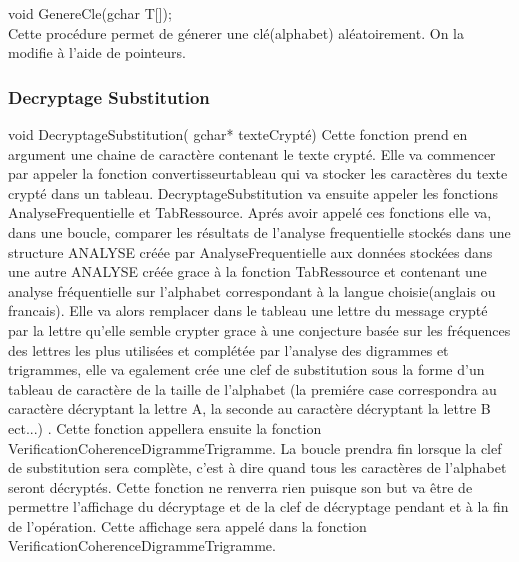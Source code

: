 \documentclass[a4]{article}
\begin{document}
	void GenereCle(gchar T[]);\\
		Cette procédure permet de génerer une clé(alphabet) aléatoirement. On la modifie à l'aide de pointeurs.
	
	\subsubsection{Decryptage Substitution}
void DecryptageSubstitution( gchar* texteCrypté)
	Cette fonction prend en argument une chaine de caractère contenant le texte crypté.
	Elle va commencer par appeler la fonction convertisseurtableau qui va stocker les  caractères 
	du texte crypté dans un tableau. DecryptageSubstitution va ensuite appeler les fonctions 
	AnalyseFrequentielle et TabRessource. Aprés avoir appelé ces fonctions elle va, dans une boucle,
	 comparer les résultats de l'analyse frequentielle stockés dans une structure ANALYSE créée par 
	 AnalyseFrequentielle aux données stockées dans une autre ANALYSE créée grace à la fonction TabRessource 
	 et contenant une analyse fréquentielle sur l'alphabet correspondant à la langue choisie(anglais ou 
	 francais). Elle va alors remplacer dans le tableau une lettre du message crypté par la lettre qu'elle
	  semble crypter grace à une conjecture basée sur les fréquences des lettres les plus utilisées et 
	  complétée par l'analyse des digrammes et trigrammes, elle va egalement crée une clef de 
	  substitution sous la forme d'un tableau de caractère de la taille de l'alphabet (la premiére case 
	  correspondra au caractère décryptant la lettre A, la seconde au caractère décryptant la lettre B ect...)
	  . Cette fonction appellera ensuite la fonction VerificationCoherenceDigrammeTrigramme. La boucle 
	  prendra fin lorsque la clef de substitution sera complète, c'est à dire quand tous les caractères
	   de l'alphabet seront décryptés.
	Cette fonction ne renverra rien puisque son but va être de permettre l'affichage du décryptage et 
	de la clef de décryptage pendant et à la fin de l'opération. Cette affichage sera appelé dans la
	 fonction VerificationCoherenceDigrammeTrigramme.
\end{document}
